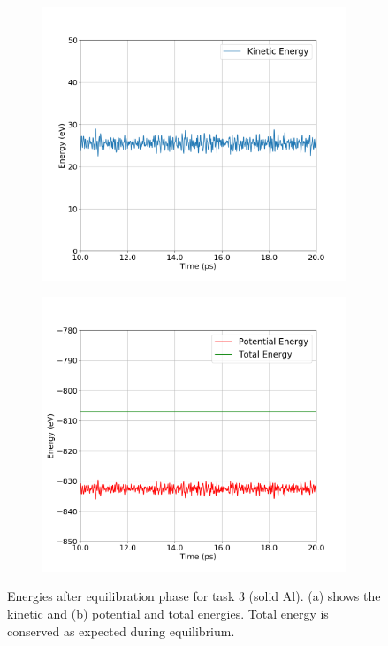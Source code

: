\begin{figure}[!htbp]
	\begin{subfigure}[b]{0.5\textwidth}
		\includegraphics[width=\textwidth]{figs/task3-k-eq.png} 
		\caption{}
	\end{subfigure}%
	\begin{subfigure}[b]{0.5\textwidth}
		\includegraphics[width=\textwidth]{figs/task3-e-p-eq.png} 
		\caption{}
	\end{subfigure}
	\caption{Energies after equilibration phase for task 3 (solid Al). (a) shows the kinetic and (b) potential and total energies. Total energy is conserved as expected during equilibrium.}
	\label{fig3-5}
\end{figure}


